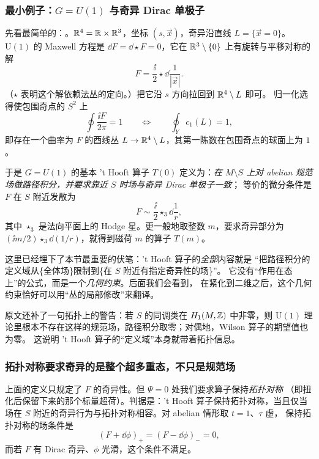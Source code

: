 \subsubsection{最小例子：$G=U(1)$ 与奇异 Dirac 单极子}

先看最简单的：。$\mathbb{R}^4=\mathbb{R}\times\mathbb{R}^3$，坐标
$(s,\vec x)$，奇异沿直线 $L=\{\vec x=0\}$。$\mathrm{U}(1)$ 的 Maxwell 方程是
$\dd F=\dd\star F=0$，它在 $\mathbb{R}^3\setminus\{0\}$ 上有旋转与平移对称的解
\begin{equation}
F=\frac{\ii}{2}\star\dd\frac{1}{|\vec x|}.
\label{eq:dirac}
\end{equation}
（$\star$ 表明这个解依赖法丛的定向。）把它沿 $s$ 方向拉回到 $\mathbb{R}^4\setminus L$ 即可。
归一化选得使包围奇点的 $S^2$ 上
\begin{equation}
\oint\frac{\ii F}{2\pi}=1
\qquad\Longleftrightarrow\qquad
\oint_{Y}c_1(L)=1,
\label{eq:flux1}
\end{equation}
即存在一个曲率为 $F$ 的酉线丛 $L\to\mathbb{R}^4\setminus L$，其第一陈数在包围奇点的球面上为 $1$。\pA{}

于是 $G=U(1)$ 的基本 't Hooft{} 算子 $T(0)$ 定义为：\emph{在 $M\setminus S$ 上对
abelian 规范场做路径积分，并要求靠近 $S$ 时场与奇异 Dirac 单极子一致}；
等价的微分条件是 $F$ 在 $S$ 附近发散为
\begin{equation}
F\sim\frac{\ii}{2}\star_3\dd\frac{1}{r},
\label{eq:sing}
\end{equation}
其中 $\star_3$ 是法向平面上的 Hodge 星。更一般地取整数 $m$，要求奇异部分为
$(\ii m/2)\star_3\dd(1/r)$，就得到磁荷 $m$ 的算子 $T(m)$。\pA{}

这里已经埋下了本节最重要的伏笔：'t Hooft{} 算子的\emph{全部}内容就是
“把路径积分的定义域从\{全体场\}限制到\{在 $S$ 附近有指定奇异性的场\}”。
它没有“作用在态上”的公式，而是一个\emph{几何约束}。后面我们会看到，
在紧化到二维之后，这个几何约束恰好可以用“丛的局部修改”来翻译。

原文还补了一句拓扑上的警告：若 $S$ 的同调类在 $H_1(M,\mathbb{Z})$ 中非零，则 $\mathrm{U}(1)$
理论里根本不存在这样的规范场，路径积分取零；对偶地，Wilson 算子的期望值也为零。
这说明 't Hooft{} 算子的“定义域”本身就带着拓扑信息。\pA{}

\subsubsection{拓扑对称要求奇异的是整个超多重态，不只是规范场}

上面的定义只规定了 $F$ 的奇异性。但 $\Psi=0$ 处我们要求算子保持\emph{拓扑对称}
（即扭化后保留下来的那个标量超荷）。判据是：'t Hooft{} 算子保持拓扑对称，当且仅当
场在 $S$ 附近的奇异行为与拓扑对称相容。对 abelian 情形取 $t=1$、$\tau$ 虚，
保持拓扑对称的场条件是
\begin{equation}
(F+\dd\phi)_+=(F-\dd\phi)_-=0,
\label{eq:topysym}
\end{equation}
而若 $F$ 有 Dirac 奇异、$\phi$ 光滑，这个条件不满足。\pA{}

